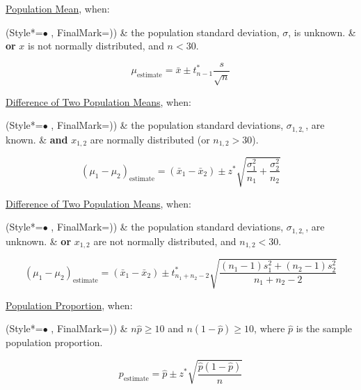 \underline{Population Mean}, when:
\begin{easylist}[itemize]
\ListProperties(Style*=$\bullet$ , FinalMark={)})
\vspace{-2.0mm}
& the population standard deviation, $\sigma$, is unknown.
\vspace{-3.5mm}
& \textbf{or} $x$ is not normally distributed, and $n < 30$.
\end{easylist}
% 
\vspace{-5.0mm}
\begin{equation}
\mu_{\textrm{estimate}} = \bar{x} \pm t^{*}_{n-1} \frac{s}{\sqrt{n}}
\end{equation}

\underline{Difference of Two Population Means}, when:
\begin{easylist}[itemize]
\ListProperties(Style*=$\bullet$ , FinalMark={)})
\vspace{-2.0mm}
& the population standard deviations, $\sigma_{1,2,}$, are known.
\vspace{-3.5mm}
& \textbf{and} $x_{1,2}$ are normally distributed (or $n_{1,2}>30$).
\end{easylist}
% 
\vspace{-5.0mm}
\begin{equation}
(\mu_1 - \mu_2)_{\textrm{estimate}} = (\bar{x}_1 - \bar{x}_2) \pm z^{*} \sqrt{\frac{\sigma_1^2}{n_1} + \frac{\sigma_2^2}{n_2}}
\end{equation}

\underline{Difference of Two Population Means}, when:
\begin{easylist}[itemize]
\ListProperties(Style*=$\bullet$ , FinalMark={)})
\vspace{-2.0mm}
& the population standard deviations, $\sigma_{1,2,}$, are unknown.
\vspace{-3.5mm}
& \textbf{or} $x_{1,2}$ are not normally distributed, and $n_{1,2}<30$.
\end{easylist}
% 
\vspace{-5.0mm}
\begin{equation}
(\mu_1 - \mu_2)_{\textrm{estimate}} = (\bar{x}_1 - \bar{x}_2) \pm t_{n_1+n_2-2}^{*} \sqrt{\frac{(n_1-1)s_1^2 + (n_2-1)s_2^2}{n_1+n_2-2}}
\end{equation}

\underline{Population Proportion}, when:
\begin{easylist}[itemize]
\ListProperties(Style*=$\bullet$ , FinalMark={)})
\vspace{-2.0mm}
& $n\hat{p}\geq10$ and $n(1-\hat{p})\geq10$, where $\hat{p}$ is the sample population proportion.
\end{easylist}
% 
\vspace{-5.0mm}
\begin{equation}
p_{\textrm{estimate}} = \hat{p} \pm z^{*} \sqrt{\frac{\hat{p}(1-\hat{p})}{n}}
\end{equation}

